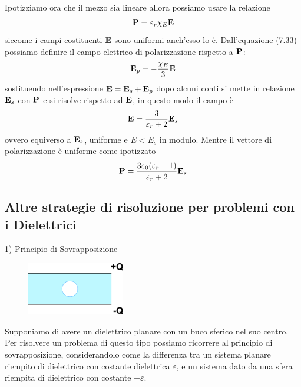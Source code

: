 Ipotizziamo ora che il mezzo sia lineare allora possiamo usare la relazione 
\begin{equation*}
	\bold{P} = \varepsilon_r \chi_{E} \bold{E}
\end{equation*}
siccome i campi costituenti $\bold{E}$ sono uniformi anch'esso lo \`e. Dall'equazione (7.33) possiamo definire il campo elettrico di polarizzazione rispetto a $\bold{P}$:
\begin{equation*}
	\bold{E}_{p} = - \frac{\chi_{E} }{3}\bold{E}
\end{equation*}
sostituendo nell'espressione $\bold{E} = \bold{E}_{s} + \bold{E}_{p}$ dopo alcuni conti si mette in relazione $\bold{E}_{s}$ con $\bold{P}$ e si risolve rispetto ad $\bold{E}$, in questo modo il campo \`e 
\begin{equation*}
	\bold{E} = \frac{3}{\varepsilon_r +2} \bold{E}_s
\end{equation*}
ovvero equiverso a $\bold{E}_{s}$, uniforme e $E < E_{s}$ in modulo. Mentre il vettore di polarizzazione \`e uniforme come ipotizzato
\begin{equation*}
	\bold{P} = \frac{3 \varepsilon_0(\varepsilon_r-1)}{\varepsilon_r +2}\bold{E}_{s}
\end{equation*}

\subsection{Altre strategie di risoluzione per problemi con i Dielettrici}
1) Principio di Sovrapposizione

\begin{figure} %
    \centering
    \includegraphics[width=0.38\textwidth]{images/voidplanar} %
\end{figure}
Supponiamo di avere un dielettrico planare con un buco sferico nel suo centro. Per risolvere un problema di questo tipo possiamo ricorrere al principio di sovrapposizione, considerandolo come la differenza tra un sistema planare riempito di dielettrico con costante dielettrica $\varepsilon$, e un sistema dato da una sfera riempita di dielettrico con costante $- \varepsilon$.

